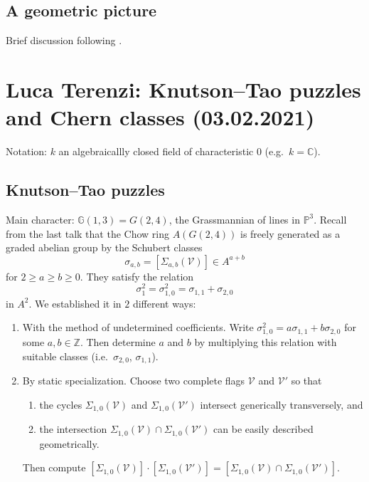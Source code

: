 \documentclass[12pt,a4paper]{amsart}
\theoremstyle{plain}
\theoremstyle{definition}
\theoremstyle{remark}
\begin{document}
\subsection{A geometric picture}

Brief discussion following \cite[\S 3.4.1]{eh16}.

\section{Luca Terenzi: Knutson--Tao puzzles and Chern classes (03.02.2021)}
Notation: $k$ an algebraicallly closed field of characteristic $0$ (e.g.~$k = \mathbb{C}$).

\subsection{Knutson--Tao puzzles}

Main character: $\mathbb{G}(1,3) = G(2,4)$, the Grassmannian of lines in $\mathbb{P}^{3}$.
Recall from the last talk that the Chow ring $A(G(2,4))$ is freely generated as a graded abelian group by the Schubert classes
\[ \sigma_{a,b} = [ \Sigma_{a,b}(\mathcal{V}) ] \in A^{a+b} \]
for $2 \geq a \geq b \geq 0$.
They satisfy the relation
\[ \sigma_{1}^{2} = \sigma_{1,0}^{2} = \sigma_{1,1} + \sigma_{2,0} \]
in $A^{2}$.
We established it in $2$ different ways:

\begin{enumerate}
  \item With the method of undetermined coefficients.
    Write $\sigma_{1,0}^{2} = a\sigma_{1,1} + b\sigma_{2,0}$ for some $a,b \in \mathbb{Z}$.
    Then determine $a$ and $b$ by multiplying this relation with suitable classes (i.e.~$\sigma_{2,0}$, $\sigma_{1,1}$).
  \item By static specialization.
    Choose two complete flags $\mathcal{V}$ and $\mathcal{V}'$ so that
    \begin{enumerate}[label=(\roman*)]
      \item the cycles $\Sigma_{1,0}(\mathcal{V})$ and $\Sigma_{1,0}(\mathcal{V}')$ intersect generically transversely, and
      \item the intersection $\Sigma_{1,0}(\mathcal{V}) \cap \Sigma_{1,0}(\mathcal{V}')$ can be easily described geometrically.
    \end{enumerate}
    Then compute $[\Sigma_{1,0}(\mathcal{V})] \cdot [\Sigma_{1,0}(\mathcal{V}')] = [\Sigma_{1,0}(\mathcal{V}) \cap \Sigma_{1,0}(\mathcal{V}')]$.
\end{enumerate}
\end{document}
